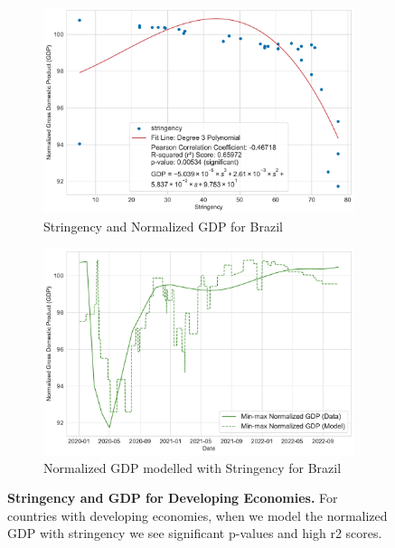 \documentclass[tikz,fleqn,12pt]{wlscirep}
\begin{document}
\begin{figure}[htbp!]
  \begin{subfigure}[t]{0.48\textwidth}
    \centering
    \includegraphics[width=\linewidth]{images/stringency_vs_gdp_BRA.pdf}
    \caption{Stringency and Normalized GDP for Brazil}
  \end{subfigure}
  \label{fig:stringency_vs_gdp_BRA}
  \hfill
  \begin{subfigure}[t]{0.48\textwidth}
    \centering
    \includegraphics[width=\linewidth]{images/gdp_modelled_with_stringency_BRA.pdf}
    \caption{Normalized GDP modelled with Stringency for Brazil}
  \end{subfigure}
  \label{fig:gdp_modelled_with_stringency_BRA}
  \caption{\textbf{Stringency and GDP for Developing Economies.} For countries with developing economies, when we model the normalized GDP with stringency we see significant p-values and high r2 scores.}
\end{figure}
\end{document}

